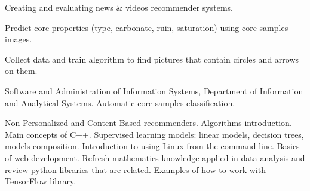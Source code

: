 \documentclass[
	a4paper,
]{fortysecondscv}
\begin{document}
\par
\makefrontsidebar{}

\begin{cvtable}[1.5]


	{Creating and evaluating news \& videos recommender systems.}

\end{cvtable}

\begin{cvtable}[1.5]


	{Predict core properties (type, carbonate, ruin, saturation)
		using core samples images.}

	{Collect data and train algorithm to find pictures that
		contain circles and arrows on them.}
\end{cvtable}



\begin{cvtable}[1.5]
	{Software and Administration of Information Systems,
		Department of Information and Analytical Systems.}
	{Automatic core samples classification.}

	{ }
\end{cvtable}

\newpage
\makebacksidebar


\begin{cvtable}[1.5]
	{Non-Personalized and Content-Based recommenders.}
	{Algorithms introduction.}
	{Main concepts of C++.}
	{Supervised learning models: linear models, decision trees,
		models composition.}
	{Introduction to using Linux from the command line.}
	{Basics of web development.}
	{Refresh mathematics knowledge applied in data analysis and
		review python libraries that are related.}
	{Examples of how to work with TensorFlow library.}
\end{cvtable}
\end{document}
